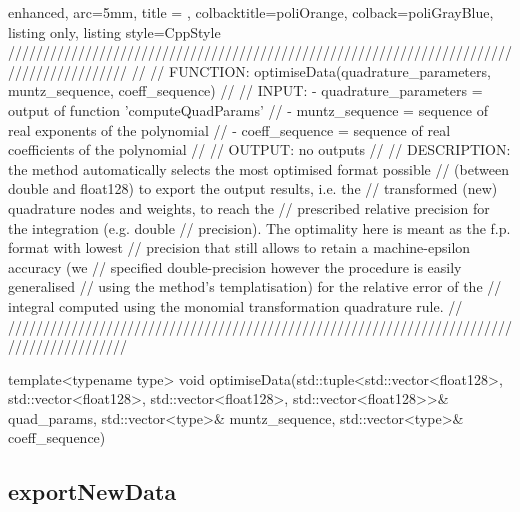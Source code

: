 \documentclass[a4paper, twosided]{book}
\begin{document}
\begin{tcblisting}{enhanced,
                   arc=5mm,
                   title = \color{black}{\large \ttfamily DatIo.cpp/optimiseData},
                   colbacktitle=poliOrange,
                   colback=poliGrayBlue,
                   listing only,
                   listing style=CppStyle}
/////////////////////////////////////////////////////////////////////////////////////////
//
//       FUNCTION: optimiseData(quadrature_parameters, muntz_sequence, coeff_sequence)
//                
//          INPUT: - quadrature_parameters = output of function 'computeQuadParams'
//                 - muntz_sequence = sequence of real exponents of the polynomial
//                 - coeff_sequence = sequence of real coefficients of the polynomial
//
//         OUTPUT: no outputs
//
//    DESCRIPTION: the method automatically selects the most optimised format possible
//                 (between double and float128) to export the output results, i.e. the
//                 transformed (new) quadrature nodes and weights, to reach the 
//                 prescribed relative precision for the integration (e.g. double 
//                 precision). The optimality here is meant as the f.p. format with lowest
//                 precision that still allows to retain a machine-epsilon accuracy (we 
//                 specified double-precision however the procedure is easily generalised
//                 using the method's templatisation) for the relative error of the
//                 integral computed using the monomial transformation quadrature rule.
//
/////////////////////////////////////////////////////////////////////////////////////////

template<typename type>
void optimiseData(std::tuple<std::vector<float128>, std::vector<float128>, std::vector<float128>, std::vector<float128>>& quad_params, std::vector<type>& muntz_sequence, std::vector<type>& coeff_sequence)
\end{tcblisting}

\subsection[exportNewData]{\changefont exportNewData}\label{SubSec4.2.4}
\end{document}
